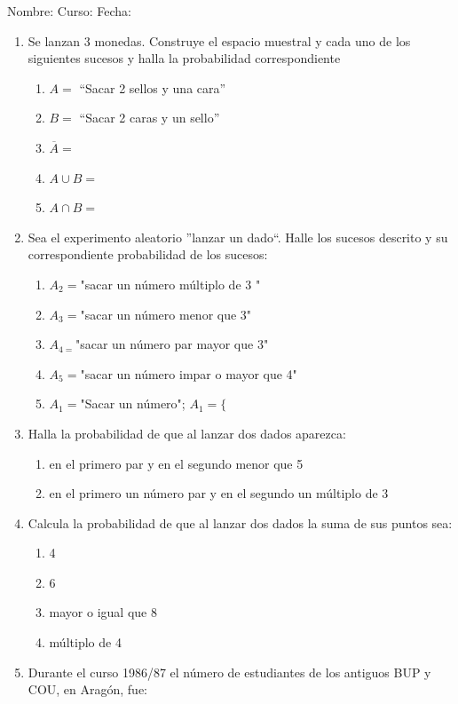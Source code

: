 \documentclass[fleqn]{article}
\newcommand{\LineaNombre}{%
\par
\vspace{\baselineskip}
Nombre:\hrulefill \; Curso: \underline{\hspace*{48pt}} \; Fecha: \underline{\hspace*{2.5cm}} \relax
\par}
\begin{document}
\LineaNombre
\begin{enumerate}
 \item Se lanzan 3 monedas. Construye el espacio muestral y cada uno de los siguientes sucesos y halla la probabilidad correspondiente
 \begin{enumerate}
 \item $A=$ ``Sacar 2 sellos y una cara'' \noanswer
 \item $B=$ ``Sacar 2 caras y un sello'' \noanswer
 \item $\overline{A}=$ \noanswer
 \item $A\cup B=$ \noanswer
 \item $A\cap B=$ \noanswer
 \end{enumerate}
 \item Sea el experimento aleatorio ''lanzar un dado``. Halle los sucesos descrito y su correspondiente probabilidad de los sucesos:
\begin{enumerate}
\item $A_{2}=$"sacar un número múltiplo de 3 " \noanswer
\item $A_{3}=$"sacar un número menor que 3" \noanswer
\item $A_{4=}$"sacar un número par mayor que 3" \noanswer
\item $A_{5}=$"sacar un número impar o mayor que 4"\noanswer
\item $A_{1}=$"Sacar un número"; $A_{1}=\{$ \noanswer
\end{enumerate}
  \newpage
\item Halla la probabilidad de que al lanzar dos dados aparezca:
\begin{enumerate}
 \item en el primero par y en el segundo menor que 5 \noanswer
 \item en el primero un número par y en el segundo un múltiplo de 3 \noanswer
\end{enumerate}
\item Calcula la probabilidad de que al lanzar dos dados la suma de sus puntos sea:
\begin{enumerate}
\item 4 \noanswer
\item 6 \noanswer
\item mayor o igual que 8 \noanswer
\item múltiplo de 4 \noanswer
\end{enumerate}
\item Durante el curso 1986/87 el número de estudiantes de los antiguos BUP y COU, en Aragón, fue:


\end{enumerate}
\end{document}
